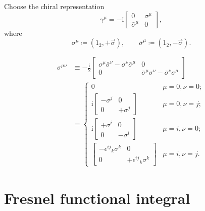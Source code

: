 \documentclass[12pt]{article}
\newcommand\mi{\mathrm{i}} %
\newcommand{\rbr}[1]{{\left(#1\right)}}
\begin{document}
Choose the chiral representation
\begin{equation}
\gamma^\mu = -\mi
\begin{bmatrix}0 & \sigma^\mu \\ \bar\sigma^\mu & 0\end{bmatrix},
\end{equation}
where
\begin{equation}
\sigma^\mu \coloneqq \rbr{1_2, +\vec{\sigma}},\qquad
\bar\sigma^\mu \coloneqq \rbr{1_2, -\vec{\sigma}}.
\end{equation}

\begin{align}
\sigma^{\mu\nu} &\equiv -\frac{\mi}{2}
\begin{bmatrix}
\sigma^\mu\bar\sigma^\nu-\sigma^\nu\bar\sigma^\mu & 0 \\
0 & \bar\sigma^\mu\sigma^\nu-\bar\sigma^\nu\sigma^\mu
\end{bmatrix} \nonumber \\
&=
\begin{cases}
0 & \mu = 0, \nu = 0; \\
\mi \begin{bmatrix}-\sigma^j & 0 \\ 0 & +\sigma^j\end{bmatrix}
& \mu = 0, \nu = j; \\
\mi \begin{bmatrix}+\sigma^i & 0 \\ 0 & -\sigma^i\end{bmatrix}
& \mu = i, \nu = 0; \\
\begin{bmatrix}
-\epsilon^{ij}{}_k \sigma^k & 0
\\ 0 & +\epsilon^{ij}{}_k \sigma^k\end{bmatrix}
& \mu = i, \nu = j.
\end{cases}
\end{align}


\section{Fresnel functional integral}

\citep[ch.~10]{mosel2004}


\printbibliography
\end{document}
